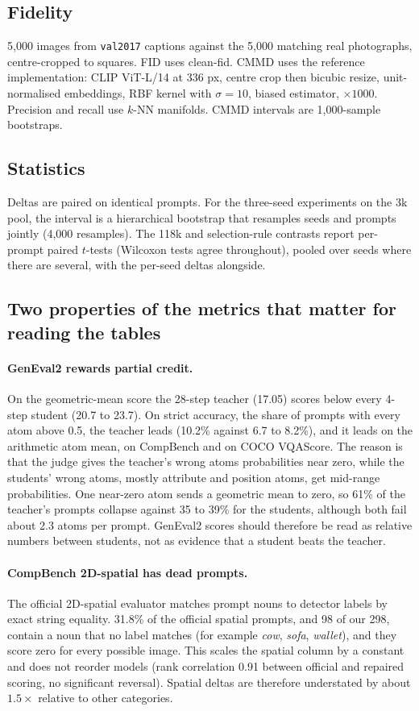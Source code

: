 \documentclass[11pt,a4paper]{article}
\begin{document}
\subsection{Fidelity}
5,000 images from \texttt{val2017} captions against the 5,000 matching real photographs, centre-cropped to squares. FID uses clean-fid. CMMD uses the reference implementation: CLIP ViT-L/14 at 336 px, centre crop then bicubic resize, unit-normalised embeddings, RBF kernel with $\sigma=10$, biased estimator, $\times1000$. Precision and recall use $k$-NN manifolds. CMMD intervals are 1,000-sample bootstraps.

\subsection{Statistics}
Deltas are paired on identical prompts. For the three-seed experiments on the 3k pool, the interval is a hierarchical bootstrap that resamples seeds and prompts jointly (4,000 resamples). The 118k and selection-rule contrasts report per-prompt paired $t$-tests (Wilcoxon tests agree throughout), pooled over seeds where there are several, with the per-seed deltas alongside.

\subsection{Two properties of the metrics that matter for reading the tables}
\label{sec:metricprops}
\paragraph{GenEval2 rewards partial credit.}
On the geometric-mean score the 28-step teacher (17.05) scores below every 4-step student (20.7 to 23.7). On strict accuracy, the share of prompts with every atom above 0.5, the teacher leads (10.2\% against 6.7 to 8.2\%), and it leads on the arithmetic atom mean, on CompBench and on COCO VQAScore. The reason is that the judge gives the teacher's wrong atoms probabilities near zero, while the students' wrong atoms, mostly attribute and position atoms, get mid-range probabilities. One near-zero atom sends a geometric mean to zero, so 61\% of the teacher's prompts collapse against 35 to 39\% for the students, although both fail about 2.3 atoms per prompt. GenEval2 scores should therefore be read as relative numbers between students, not as evidence that a student beats the teacher.

\paragraph{CompBench 2D-spatial has dead prompts.}
The official 2D-spatial evaluator matches prompt nouns to detector labels by exact string equality. 31.8\% of the official spatial prompts, and 98 of our 298, contain a noun that no label matches (for example \emph{cow}, \emph{sofa}, \emph{wallet}), and they score zero for every possible image. This scales the spatial column by a constant and does not reorder models (rank correlation 0.91 between official and repaired scoring, no significant reversal). Spatial deltas are therefore understated by about $1.5\times$ relative to other categories.
\end{document}
